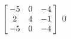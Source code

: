 {$\left[\hskip -3pt \begin{array}{ccc} -5&0&-4\\  2&4&-1
\\  -5&0&-4\end{array}\hskip -3pt \right]$} 
{$0$}

  

 

